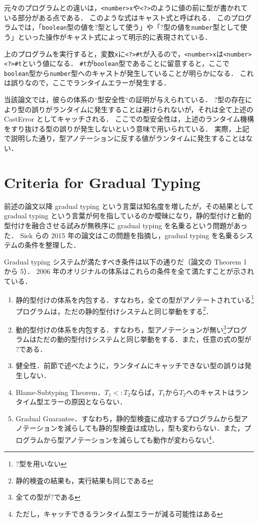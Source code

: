 元々のプログラムとの違いは，\texttt{<number>x}や\texttt{<?>}のように値の前に型が書かれている部分がある点である．
このような式はキャスト式と呼ばれる．
このプログラムでは，「\texttt{boolean}型の値を$?$型として使う」や「$?$型の値を\texttt{number}型として使う」といった操作がキャスト式によって明示的に表現されている．

上のプログラムを実行すると，変数\texttt{x}に\texttt{<?>\#t}が入るので，\texttt{<number>x}は\texttt{<number><?>\#t}という値になる．
\texttt{\#t}が\texttt{boolean}型であることに留意すると，ここで\texttt{boolean}型から\texttt{number}型へのキャストが発生していることが明らかになる．
これは誤りなので，ここでランタイムエラーが発生する．

当該論文では，彼らの体系の“型安全性“の証明が与えられている．
$?$型の存在により型の誤りがランタイムに発生することは避けられないが，それは全て上述の CastError としてキャッチされる．
ここでの型安全性は，上述のランタイム機構をすり抜ける型の誤りが発生しないという意味で用いられている．
実際，上記で説明した通り，型アノテーションに反する値がランタイムに発生することはない．

\section{Criteria for Gradual Typing}

前述の論文以降 gradual typing という言葉は知名度を増したが，その結果として gradual typing という言葉が何を指しているのか曖昧になり，静的型付けと動的型付けを融合させる試みが無秩序に gradual typing を名乗るという問題があった．
Siek ら\cite{siek_et_al:LIPIcs.SNAPL.2015.274}の 2015 年の論文はこの問題を指摘し，gradual typing を名乗るシステムの条件を整理した．

Gradual typing システムが満たすべき条件は以下の通りだ（論文の Theorem 1 から 5）．
2006 年のオリジナルの体系はこれらの条件を全て満たすことが示されている．

\begin{enumerate}
    \item 静的型付けの体系を内包する．すなわち，全ての型がアノテートされている\footnote{$?$型を用いない}プログラムは，ただの静的型付けシステムと同じ挙動をする\footnote{静的検査の結果も，実行結果も同じである}．
    \item 動的型付けの体系を内包する．すなわち，型アノテーションが無い\footnote{全ての型が$?$である}プログラムはただの動的型付けシステムと同じ挙動をする．また，任意の式の型が$?$である．
    \item 健全性．前節で述べたように，ランタイムにキャッチできない型の誤りは発生しない．
    \item Blame-Subtyping Theorem．$T_1 <: T_2$ならば，$T_1$から$T_2$へのキャストはランタイム型エラーの原因とならない．
    \item Gradual Guarantee．すなわち，静的型検査に成功するプログラムから型アノテーションを減らしても静的型検査は成功し，型も変わらない．また，プログラムから型アノテーションを減らしても動作が変わらない\footnote{ただし，キャッチできるランタイム型エラーが減る可能性はある}．
\end{enumerate}

